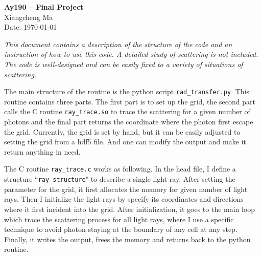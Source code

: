 \documentclass[11pt,letterpaper]{article}
\begin{document}
\begin{center}
\Large
{\bf Ay190 -- Final Project} \\
\large
Xiangcheng Ma \\
Date: \today
\end{center}

{\it This document contains a description of the structure of the code and an instruction of how to use this code. A detailed study of scattering is not included. The code is well-designed and can be easily fixed to a variety of situations of scattering.}

The main structure of the routine is the python script {\tt rad\_transfer.py}. This routine contains three parts. The first part is to set up the grid, the second part calls the C routine {\tt ray\_trace.so} to trace the scattering for a given number of photons and the final part returns the coordinate where the photon first escape the grid. Currently, the grid is set by hand, but it can be easily adjusted to setting the grid from a hdf5 file. And one can modify the output and make it return anything in need.

The C routine {\tt ray\_trace.c} works as following. In the head file, I define a structure ``{\tt ray\_structure}" to describe a single light ray. After setting the parameter for the grid, it first allocates the memory for given number of light rays. Then I initialize the light rays by specify its coordinates and directions where it first incident into the grid. After initialization, it goes to the main loop which trace the scattering process for all light rays, where I use a specific technique to avoid photon staying at the boundary of any cell at any step. Finally, it writes the output, frees the memory and returns back to the python routine. 
\end{document}
